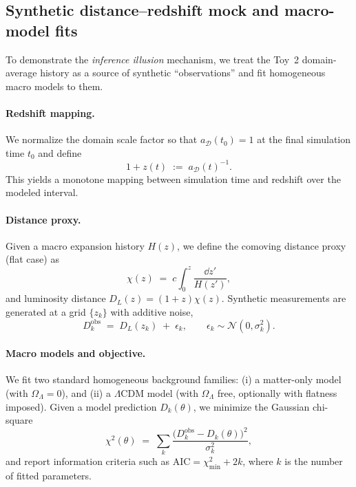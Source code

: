\documentclass[11pt]{article}
\theoremstyle{definition}
\theoremstyle{plain}
\theoremstyle{remark}
\begin{document}
\subsection{Synthetic distance--redshift mock and macro-model fits}\label{sec:methods:synthetic_distance}
To demonstrate the \emph{inference illusion} mechanism, we treat the Toy~2 domain-average history as a source of synthetic ``observations'' and fit homogeneous macro models to them.

\paragraph{Redshift mapping.}
We normalize the domain scale factor so that $a_{\mathcal{D}}(t_0)=1$ at the final simulation time $t_0$ and define
\begin{equation}
1+z(t) \;:=\; a_{\mathcal{D}}(t)^{-1}.
\label{eq:synthetic_z_def}
\end{equation}
This yields a monotone mapping between simulation time and redshift over the modeled interval.

\paragraph{Distance proxy.}
Given a macro expansion history $H(z)$, we define the comoving distance proxy (flat case) as
\begin{equation}
\chi(z) \;=\; c\int_{0}^{z}\frac{\dd z'}{H(z')},
\label{eq:chi_def}
\end{equation}
and luminosity distance $D_L(z)=(1+z)\chi(z)$.
Synthetic measurements are generated at a grid $\{z_k\}$ with additive noise,
\begin{equation}
D^{\mathrm{obs}}_k \;=\; D_L(z_k) \;+\; \epsilon_k,\qquad \epsilon_k\sim\mathcal{N}(0,\sigma_k^2).
\label{eq:distance_mock}
\end{equation}

\paragraph{Macro models and objective.}
We fit two standard homogeneous background families:
(i) a matter-only model (with $\Omega_\Lambda=0$), and
(ii) a $\Lambda$CDM model (with $\Omega_\Lambda$ free, optionally with flatness imposed).
Given a model prediction $D_k(\theta)$, we minimize the Gaussian chi-square
\begin{equation}
\chi^2(\theta) \;=\; \sum_{k}\frac{\big(D^{\mathrm{obs}}_k - D_k(\theta)\big)^2}{\sigma_k^2},
\label{eq:chi2_def}
\end{equation}
and report information criteria such as $\mathrm{AIC}=\chi^2_{\min}+2k$, where $k$ is the number of fitted parameters.
\end{document}
